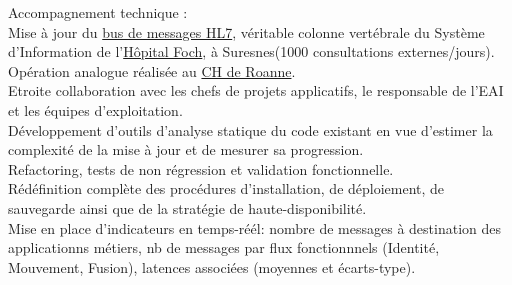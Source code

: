\begin{cventries}
{\begin{cvitems}
        \item {Accompagnement technique :\\Mise à jour du \href{https://www.intersystems.com/products/ensemble}{bus de messages HL7}, véritable colonne vertébrale du Système d'Information de l'\href{http://www.hopital-foch.com/hopital/}{Hôpital Foch}, à Suresnes(1000 consultations externes/jours).\\Opération analogue réalisée au \href{http://www.ch-roanne.fr}{CH de Roanne}.\\ Etroite collaboration avec les chefs de projets applicatifs, le responsable de l'EAI et les équipes d'exploitation.\\Développement d'outils d'analyse statique du code existant en vue d'estimer la complexité de la mise à jour et de mesurer sa progression.\\Refactoring, tests de non régression et validation fonctionnelle.\\Rédéfinition complète des procédures d'installation, de déploiement, de sauvegarde ainsi que de la stratégie de haute-disponibilité.\\Mise en place d'indicateurs en temps-réél: nombre de messages à destination des applicationns métiers, nb de messages par flux fonctionnnels (Identité, Mouvement, Fusion), latences associées (moyennes et écarts-type).}
      \end{cvitems}
} %


\end{cventries}
